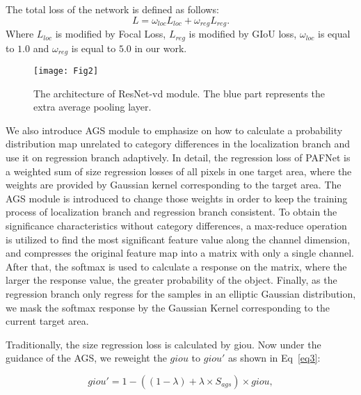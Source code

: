 \documentclass[10pt,twocolumn,letterpaper]{article}
\begin{document}
    The total loss of the network is defined as follows:
    \begin{equation}
    \label{eq2}
    L = {\omega_{loc}} {L_{loc}} + {\omega_{reg}}{L_{reg}}.
    \end{equation}
    Where ${L_{loc}}$ is modified by Focal Loss, $L_{reg}$ is modified by GIoU loss, ${\omega_{loc}}$ is equal to ${1.0}$ and ${\omega_{reg}}$ is equal to ${5.0}$ in our work.
    
    \begin{figure}[h]
\begin{center}
			\centerline{\texttt{[image: Fig2]}}
			\caption{The architecture of ResNet-vd module. The blue part represents the extra average pooling layer.}
			\label{Fig2}
		\end{center}
\end{figure}











    We also introduce AGS module to emphasize on how to calculate a probability distribution map unrelated to category differences in the localization branch and use it on regression branch adaptively. In detail, the regression loss of PAFNet is a weighted sum of size regression losses of all pixels in one target area, where the weights are provided by Gaussian kernel corresponding to the target area. The AGS module is introduced to change those weights in order to keep the training process of localization branch and regression branch consistent. To obtain the significance characteristics without category differences, a max-reduce operation is utilized to find the most significant feature value along the channel dimension, and compresses the original feature map into a matrix with only a single channel. After that, the softmax is used to calculate a response on the matrix, where the larger the response value, the greater probability of the object. Finally, as the regression branch only regress for the samples in an elliptic Gaussian distribution, we mask the softmax response by the Gaussian Kernel corresponding to the current target area. 
    
    Traditionally, the size regression loss is calculated by giou. Now under the guidance of the AGS, we reweight the $giou$ to $giou'$ as shown in Eq~\ref{eq3}:
    
    \begin{equation}
    \label{eq3}
    giou' = 1 - ( (1 - \lambda) + \lambda \times S_{ags}) \times giou,
    \end{equation}
    
\end{document}
